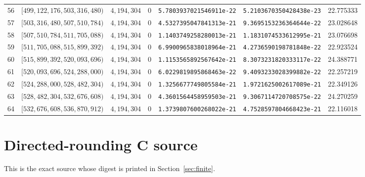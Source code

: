 \documentclass[11pt]{article}
\newcommand{\1}{\mathbf 1}
\theoremstyle{plain}
\theoremstyle{definition}
\theoremstyle{remark}
\begin{document}
\begin{landscape}
\begin{longtable}{@{}r r r r l l r@{}}
56 & $[499,122,176,503,316,480)$ & $4,194,304$ & 0 & \texttt{5.7803937021546911e-22} & \texttt{5.2103670350428438e-23} & 22.775333\\
57 & $[503,316,480,507,510,784)$ & $4,194,304$ & 0 & \texttt{4.5327395047841313e-21} & \texttt{9.3695153236364644e-22} & 23.028648\\
58 & $[507,510,784,511,705,088)$ & $4,194,304$ & 0 & \texttt{1.1403749258280013e-21} & \texttt{1.1831074533612995e-21} & 23.076698\\
59 & $[511,705,088,515,899,392)$ & $4,194,304$ & 0 & \texttt{6.9900965838018964e-21} & \texttt{4.2736590198781848e-22} & 22.923524\\
60 & $[515,899,392,520,093,696)$ & $4,194,304$ & 0 & \texttt{1.1153565892567642e-21} & \texttt{8.3073231820333117e-22} & 24.388771\\
61 & $[520,093,696,524,288,000)$ & $4,194,304$ & 0 & \texttt{6.0229819895868463e-22} & \texttt{9.4093233028399882e-22} & 22.257219\\
62 & $[524,288,000,528,482,304)$ & $4,194,304$ & 0 & \texttt{1.3256677749805584e-21} & \texttt{1.9721625002617089e-21} & 22.349126\\
63 & $[528,482,304,532,676,608)$ & $4,194,304$ & 0 & \texttt{4.3601564458959503e-21} & \texttt{9.3067114720708575e-22} & 24.270259\\
64 & $[532,676,608,536,870,912)$ & $4,194,304$ & 0 & \texttt{1.3739807600268022e-21} & \texttt{4.7528597804668423e-21} & 22.116018\\
\end{longtable}
\endgroup
\end{landscape}
\pagestyle{fancy}

\section{Directed-rounding C source}
\label{app:C-source}

This is the exact source whose digest is printed in
Section~\ref{sec:finite}.
\end{document}
